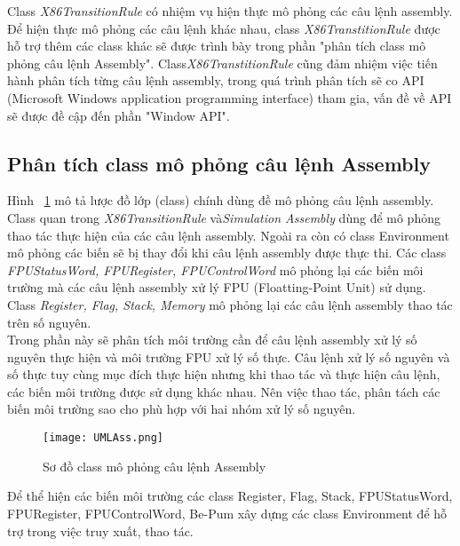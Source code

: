 		Class  \textit{X86TransitionRule} có nhiệm vụ hiện thực mô phỏng các câu lệnh assembly. Để hiện thực mô phỏng các câu lệnh khác nhau, class \textit{X86TranstitionRule} được hỗ trợ thêm các class khác sẽ được trình bày trong phần "phân tích class mô phỏng câu lệnh Assembly". Class\textit{X86TranstitionRule} cũng đảm nhiệm việc tiến hành phân tích từng câu lệnh assembly, trong quá trình phân tích sẽ  co API (Microsoft Windows application programming interface) tham gia, vấn đề về API sẽ được đề cập đến phần "Window API".
		
		\newpage
	\subsection{Phân tích class mô phỏng câu lệnh Assembly}
	Hình ~\ref{fig:SoDoClassAss}	mô tả lược đồ lớp (class)  chính dùng đề mô phỏng câu lệnh assembly. Class quan trong \textit{X86TransitionRule} và\textit{Simulation Assembly} dùng để mô phỏng thao tác thực hiện của các câu lệnh assembly. Ngoài ra còn có class Environment mô phỏng các biến sẽ bị thay đổi khi câu lệnh assembly được thực thi. Các class \textit{FPUStatusWord, FPURegister, FPUControlWord} mô phỏng lại các biến môi trường mà các câu lệnh assembly xử lý FPU (Floatting-Point Unit) sử dụng. Class \textit{Register, Flag, Stack, Memory} mô phỏng lại các câu lệnh assembly thao tác trên số nguyên.\\
	
	Trong phần này sẽ phân tích môi trường cần để câu lệnh assembly xử lý số nguyên thực hiện và môi trường FPU xử lý số thực. Câu lệnh xử lý số nguyên và số thực tuy cùng mục đích thực hiện nhưng khi thao tác và thực hiện câu lệnh, các biến môi trường được sử dụng khác nhau. Nên việc thao tác, phân tách các biến môi trường sao cho phù hợp với hai nhóm xử lý số nguyên.	
		\begin{center}
			\begin{figure}[htp]
				\begin{center}
					\texttt{[image: UMLAss.png]}
				\end{center}
				\caption{Sơ đồ class mô phỏng câu lệnh Assembly}	
					\label{fig:SoDoClassAss}		
			\end{figure}
		\end{center}			
		
		\newpage
		Để thể hiện các biến môi trường các class Register, Flag, Stack, FPUStatusWord, FPURegister, FPUControlWord,  Be-Pum xây dựng các class Environment để hỗ trợ trong việc truy xuất, thao tác.	
	
